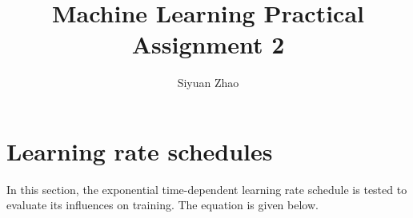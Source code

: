 \documentclass[11pt]{article}
\begin{document}
\title{Machine Learning Practical \\Assignment 2}

\author{Siyuan Zhao}
\maketitle
\section{Learning rate schedules}
In this section, the exponential time-dependent learning rate schedule is tested to evaluate its influences on training. The equation is given below.
\end{document}
